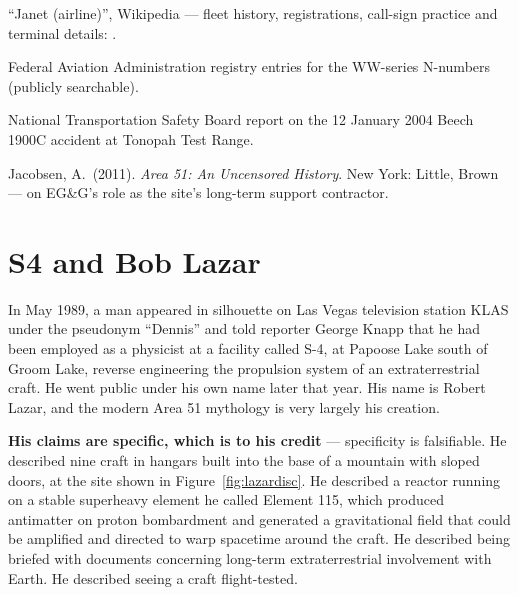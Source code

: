 \begin{srcnotes}
\item ``Janet (airline)'', Wikipedia --- fleet history, registrations, call-sign practice and
terminal details: .
\item Federal Aviation Administration registry entries for the WW-series N-numbers
(publicly searchable).
\item National Transportation Safety Board report on the 12 January 2004 Beech 1900C
accident at Tonopah Test Range.
\item Jacobsen, A.\ (2011). \emph{Area 51: An Uncensored History}. New York: Little, Brown
--- on EG\&G's role as the site's long-term support contractor.
\end{srcnotes}

\Needspace*{0.40\textheight}
\section{S4 and Bob Lazar}\label{sec:s4lazar}

In May 1989, a man appeared in silhouette on Las Vegas television station KLAS under the
pseudonym ``Dennis'' and told reporter George Knapp that he had been employed as a
physicist at a facility called S-4, at Papoose Lake south of Groom Lake, reverse
engineering the propulsion system of an extraterrestrial craft. He went public under his
own name later that year. His name is Robert Lazar, and the modern Area 51 mythology is
very largely his creation.

\textbf{\textcolor{ufogreendark}{His claims are specific, which is to his credit}} --- specificity is falsifiable. He described nine craft in hangars built into the base of a mountain with sloped doors, at the site shown in Figure~\ref{fig:lazardisc}. He
described a reactor running on a stable superheavy element he called Element 115, which
produced antimatter on proton bombardment and generated a gravitational field that could
be amplified and directed to warp spacetime around the craft. He described being briefed
with documents concerning long-term extraterrestrial involvement with Earth. He described
seeing a craft flight-tested.

